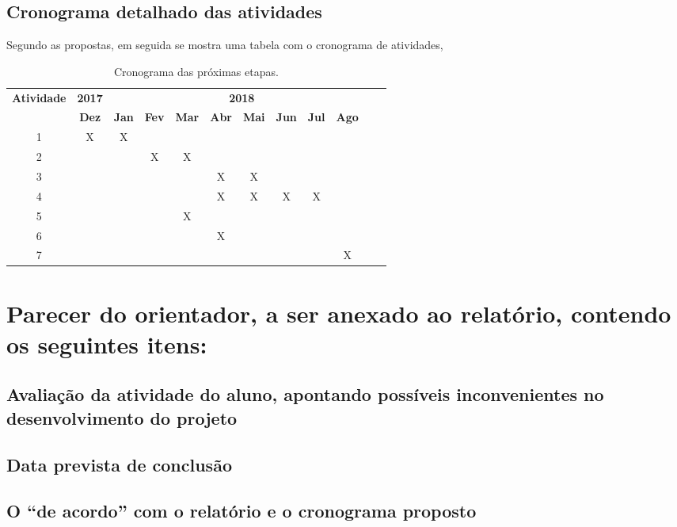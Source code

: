 \documentclass[a4paper, 11pt]{article}
\begin{document}
\subsection{Cronograma detalhado das atividades}
Segundo as propostas, em seguida se mostra uma tabela com o cronograma de atividades,
\begin{table}[H]
\centering
\begin{tabular}{cccccccccccc}
\toprule \multirow{2}{*}{\textbf{Atividade}}& \multicolumn{1}{c}{\textbf{2017}} & \multicolumn{9}{c}{\textbf{2018}} \\ \cline{2-12}
  & \textbf{Dez} & \textbf{Jan} & \textbf{Fev} & \textbf{Mar} & \textbf{Abr} & \textbf{Mai} & \textbf{Jun} & \textbf{Jul} & \textbf{Ago} & \textbf{} & \textbf{}\\ \midrule 
1 & X & X &   &   &   &   &   &   &   &   \\ 
2 &   &   & X & X &   &   &   &   &   &   \\
3 &   &   &   &   & X & X &   &   &   &   \\ 
4 &   &   &   &   & X & X & X & X &   &   \\ 
5 &   &   &   & X &   &   &   &   &   &   \\
6 &   &   &   &   & X &   &   &   &   &   \\
7 &   &   &   &   &   &   &   &   & X &   \\ \bottomrule
\end{tabular}
\caption{Cronograma das pr\'oximas etapas.}
\label{tab:cronograma}
\end{table}

\section{Parecer do orientador, a ser anexado ao relatório, contendo os seguintes itens:}

\subsection{Avaliação   da   atividade   do   aluno,   apontando   possíveis   inconvenientes   no desenvolvimento do projeto}
\subsection{Data prevista de conclusão}
\subsection{O “de acordo” com o relatório e o cronograma proposto}
\end{document}

